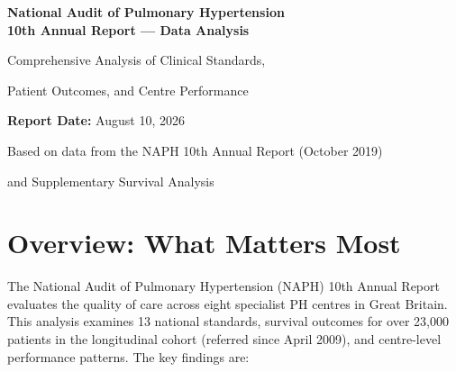 \documentclass[12pt,a4paper]{article}
\begin{document}
\begin{titlepage}
\centering
\vspace*{2cm}
{\Huge\bfseries National Audit of Pulmonary Hypertension\\[0.5cm]
10th Annual Report — Data Analysis\par}
\vspace{1cm}
{\Large Comprehensive Analysis of Clinical Standards,\par
Patient Outcomes, and Centre Performance\par}
\vspace{2cm}
{\large\textbf{Report Date:} August 10, 2026\par}
\vspace{1cm}
{\small Based on data from the NAPH 10th Annual Report (October 2019)\par
and Supplementary Survival Analysis\par}
\vfill
\end{titlepage}

\tableofcontents
\newpage

\section{Overview: What Matters Most}

The National Audit of Pulmonary Hypertension (NAPH) 10th Annual Report evaluates the quality of care across eight specialist PH centres in Great Britain. This analysis examines 13 national standards, survival outcomes for over 23,000 patients in the longitudinal cohort (referred since April 2009), and centre-level performance patterns. The key findings are:
\end{document}
